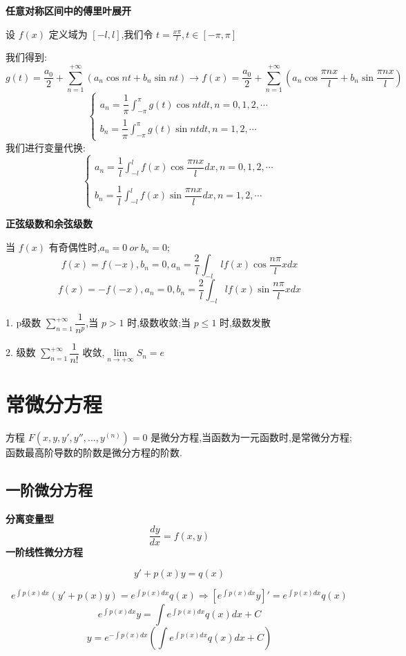 \textbf{任意对称区间中的傅里叶展开}
\begin{definition}
	设 $f(x)$ 定义域为 $[-l,l]$,我们令 $t=\frac{x\pi}{l},t\in[-\pi,\pi]$

	我们得到:
	$$g(t)=\frac{a_{0}}{2}+\sum\limits_{n=1}^{+\infty}(a_{n}\cos nt+b_{n}\sin nt)\rightarrow f(x)=\frac{a_{0}}{2}+\sum\limits_{n=1}^{+\infty}(a_{n}\cos \dfrac{\pi nx}{l}+b_{n}\sin \dfrac{\pi nx}{l})$$
	$$\left\lbrace \begin{array}{l}
			a_{n}=\dfrac{1}{\pi}\int_{-\pi}^{\pi}g(t)\cos ntdt,n=0,1,2,\cdots \\
			b_{n}=\dfrac{1}{\pi}\int_{-\pi}^{\pi}g(t)\sin ntdt,n=1,2,\cdots
		\end{array}\right. $$
	我们进行变量代换:
	$$\left\lbrace \begin{array}{l}
			a_{n}=\dfrac{1}{l}\int_{-l}^{l}f(x)\cos \dfrac{\pi nx}{l}dx,n=0,1,2,\cdots \\
			\\
			b_{n}=\dfrac{1}{l}\int_{-l}^{l}f(x)\sin \dfrac{\pi nx}{l}dx,n=1,2,\cdots
		\end{array}\right. $$
\end{definition}
\textbf{正弦级数和余弦级数}

当 $f(x)$ 有奇偶性时,$a_{n}=0 \ or\ b_{n}=0$;
$$f(x)=f(-x),b_{n}=0,a_{n}=\dfrac{2}{l}\int_{-l}{l}f(x)\cos \dfrac{n\pi}{l}xdx$$
$$f(x)=-f(-x),a_{n}=0,b_{n}=\dfrac{2}{l}\int_{-l}{l}f(x)\sin \dfrac{n\pi}{l}xdx$$
\begin{anymark}[总结]\label{mark: $p$级数}
	1. p级数 $\sum\limits_{n=1}^{+\infty}\dfrac{1}{n^{p}}$,当 $p>1$ 时,级数收敛;当 $p\leq 1$ 时,级数发散

	2. 级数 $\sum\limits_{n=1}^{+\infty}\dfrac{1}{n!}$ 收敛,$\lim\limits_{n\rightarrow+\infty}S_{n}=e$
\end{anymark}
\chapter{常微分方程}

\begin{definition}
	方程 $F(x,y,y',y'',\dots,y^{(n)})=0$ 是微分方程,当函数为一元函数时,是常微分方程;函数最高阶导数的阶数是微分方程的阶数.
\end{definition}
\section{一阶微分方程}
\textbf{分离变量型} \label{def: 分离变量型一阶微分方程}
$$\frac{dy}{dx}=f(x,y)$$
\textbf{一阶线性微分方程} \label{def: 一阶线性微分方程公式}
\begin{definition}
	$$y'+p(x)y=q(x)$$
\end{definition}
\begin{theorem}[一阶线性微分方程解]
	$$e^{\int p(x)dx}(y'+p(x)y)=e^{\int p(x)dx}q(x)\Rightarrow \left[e^{\int p(x)dx}y \right]'=e^{\int p(x)dx}q(x) $$
	$$e^{\int p(x)dx}y=\int e^{\int p(x)dx}q(x)dx+C$$
	$$y=e^{-\int p(x)dx}(\int e^{\int p(x)dx}q(x)dx+C)$$
\end{theorem}

